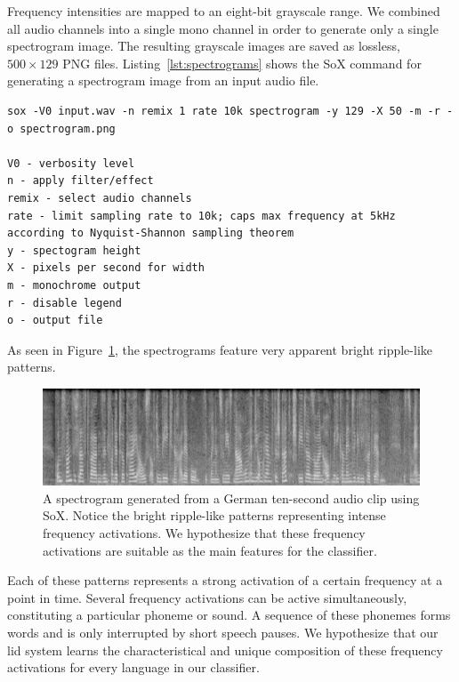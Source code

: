 Frequency intensities are mapped to an eight-bit grayscale range. We combined all audio channels into a single mono channel in order to generate only a single spectrogram image. The resulting grayscale images are saved as lossless, $500 \times 129$ PNG files. Listing~\ref{lst:spectrograms} shows the SoX command for generating a spectrogram image from an input audio file.

	\begin{listing}[tp]
	\begin{lstlisting}[caption={SoX command and options used for generating monochrome spectrograms. All audio files were discretized into \num{129}~frequency buckets using a constant pixel width per time step, resulting in spectrogram images of $500 \times 129$ pixels.}, label={lst:spectrograms}]
sox -V0 input.wav -n remix 1 rate 10k spectrogram -y 129 -X 50 -m -r -o spectrogram.png

V0 - verbosity level 
n - apply filter/effect
remix - select audio channels
rate - limit sampling rate to 10k; caps max frequency at 5kHz according to Nyquist-Shannon sampling theorem
y - spectogram height
X - pixels per second for width
m - monochrome output
r - disable legend
o - output file
    \end{lstlisting}
    \end{listing}

	As seen in Figure~\ref{fig:spectrogram}, the spectrograms feature very apparent bright ripple-like patterns.
%
	\begin{figure}[tp]
  		\centering
    	\includegraphics[width=\textwidth,keepaspectratio]{img/spectrogram.png}
    	\caption{A spectrogram generated from a German ten-second audio clip using SoX. Notice the bright ripple-like patterns representing intense frequency activations. We hypothesize that these frequency activations are suitable as the main features for the classifier.}
    	\label{fig:spectrogram}
	\end{figure}
%
	Each of these patterns represents a strong activation of a certain frequency at a point in time. Several frequency activations can be active simultaneously, constituting a particular phoneme or sound. A sequence of these phonemes forms words and is only interrupted by short speech pauses. We hypothesize that our \ac{lid} system learns the characteristical and unique composition of these frequency activations for every language in our classifier.

